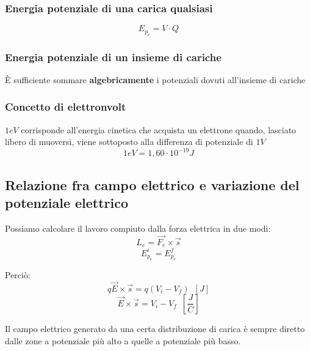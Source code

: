     \subsubsection{Energia potenziale di una carica qualsiasi}
    \begin{equation*}
        E_{p_e}=V\cdot Q
    \end{equation*}
    \subsubsection{Energia potenziale di un insieme di cariche}
    \par È sufficiente sommare \textbf{algebricamente} i potenziali dovuti all'insieme di cariche
    \subsubsection{Concetto di elettronvolt}
    $1 eV$ corrisponde all'energia cinetica che acquista un elettrone quando, lasciato libero di muoversi, viene sottoposto alla differenza di potenziale di $1 V$
    \begin{equation*}
        1 eV=1,60\cdot10^{-19}J
    \end{equation*}
\subsection{Relazione fra campo elettrico e variazione del potenziale elettrico}
    \par Possiamo calcolare il lavoro compiuto dalla forza elettrica in due modi:
    \begin{equation*}
        L_e=\vec{F_e}\times \vec{s}
    \end{equation*}
    \begin{equation*}
        E_{p_e}^i=E_{p_e}^f
    \end{equation*}
    \par Perciò:
    \begin{equation*}
        q\vec{E}\times \vec{s} = q(V_i-V_f)\enspace [J]
    \end{equation*}
    \begin{equation} \label{eq:46relCampoElettricoVarEPE}
        \vec{E} \times \vec{s} = V_i-V_f\enspace [\frac{J}{C}]
    \end{equation}
    \par Il campo elettrico generato da una certa distribuzione di carica è sempre diretto dalle zone a potenziale più alto a quelle a potenziale più basso.
